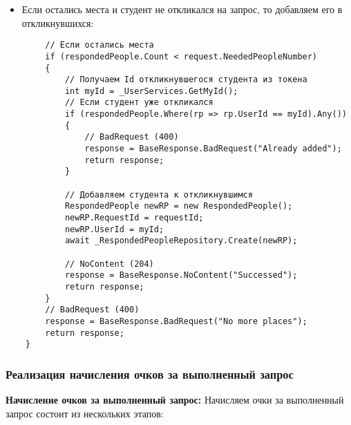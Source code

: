 \begin{itemize}
	\item{Если остались места и студент не откликался на запрос, то добавляем его в откликнувшихся:}
\end{itemize}
\begin{verbatim}
        // Если остались места
        if (respondedPeople.Count < request.NeededPeopleNumber)
        {
            // Получаем Id откликнувшегося студента из токена
            int myId = _UserServices.GetMyId();
            // Если студент уже откликался
            if (respondedPeople.Where(rp => rp.UserId == myId).Any())
            {
                // BadRequest (400)
                response = BaseResponse.BadRequest("Already added");
                return response;
            }

            // Добавляем студента к откликнувшимся
            RespondedPeople newRP = new RespondedPeople();
            newRP.RequestId = requestId;
            newRP.UserId = myId;
            await _RespondedPeopleRepository.Create(newRP);

            // NoContent (204)
            response = BaseResponse.NoContent("Successed");
            return response;
        }
        // BadRequest (400)
        response = BaseResponse.BadRequest("No more places");
        return response;
    }
\end{verbatim}

\subsubsection{Реализация начисления очков за выполненный запрос}

\textbf{Начисление очков за выполненный запрос:} Начисляем очки за выполненный запрос состоит из нескольких этапов:

